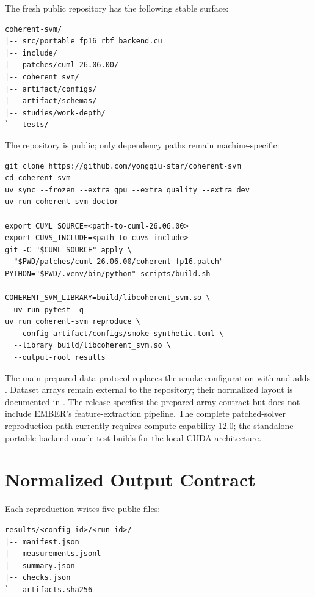 The fresh public repository has the following stable surface:

\begin{lstlisting}[style=codeblock]
coherent-svm/
|-- src/portable_fp16_rbf_backend.cu
|-- include/
|-- patches/cuml-26.06.00/
|-- coherent_svm/
|-- artifact/configs/
|-- artifact/schemas/
|-- studies/work-depth/
`-- tests/
\end{lstlisting}

The repository is public; only dependency paths remain machine-specific:

\begin{lstlisting}[style=codeblock]
git clone https://github.com/yongqiu-star/coherent-svm
cd coherent-svm
uv sync --frozen --extra gpu --extra quality --extra dev
uv run coherent-svm doctor

export CUML_SOURCE=<path-to-cuml-26.06.00>
export CUVS_INCLUDE=<path-to-cuvs-include>
git -C "$CUML_SOURCE" apply \
  "$PWD/patches/cuml-26.06.00/coherent-fp16.patch"
PYTHON="$PWD/.venv/bin/python" scripts/build.sh

COHERENT_SVM_LIBRARY=build/libcoherent_svm.so \
  uv run pytest -q
uv run coherent-svm reproduce \
  --config artifact/configs/smoke-synthetic.toml \
  --library build/libcoherent_svm.so \
  --output-root results
\end{lstlisting}

The main prepared-data protocol replaces the smoke configuration with
 and adds
. Dataset arrays remain external to the
repository; their normalized layout is documented in
. The release specifies the prepared-array contract
but does not include EMBER's feature-extraction pipeline.
The complete patched-solver reproduction path currently requires compute
capability 12.0; the standalone portable-backend oracle test builds for the
local CUDA architecture.

\section{Normalized Output Contract}
\label{app:output-contract}

Each reproduction writes five public files:

\begin{lstlisting}[style=codeblock]
results/<config-id>/<run-id>/
|-- manifest.json
|-- measurements.jsonl
|-- summary.json
|-- checks.json
`-- artifacts.sha256
\end{lstlisting}

